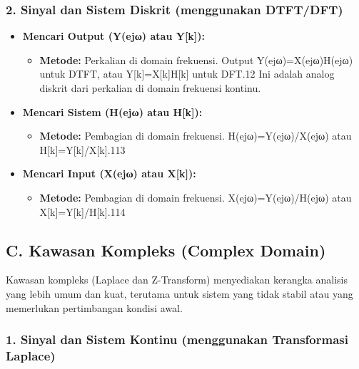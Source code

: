 \documentclass[
  letterpaper,
  DIV=11,
  numbers=noendperiod]{scrreprt}
\providecommand{\tightlist}{%
  \setlength{\itemsep}{0pt}\setlength{\parskip}{0pt}}\usepackage{longtable,booktabs,array}
\begin{document}
\subsubsection{2. Sinyal dan Sistem Diskrit (menggunakan
DTFT/DFT)}\label{sinyal-dan-sistem-diskrit-menggunakan-dtftdft}

\begin{itemize}
\item
  \textbf{Mencari Output (Y(ejω) atau Y{[}k{]}):}

  \begin{itemize}
  \tightlist
  \item
    \textbf{Metode:} Perkalian di domain frekuensi. Output
    Y(ejω)=X(ejω)H(ejω) untuk DTFT, atau Y{[}k{]}=X{[}k{]}H{[}k{]} untuk
    DFT.12 Ini adalah analog diskrit dari perkalian di domain frekuensi
    kontinu.
  \end{itemize}
\item
  \textbf{Mencari Sistem (H(ejω) atau H{[}k{]}):}

  \begin{itemize}
  \tightlist
  \item
    \textbf{Metode:} Pembagian di domain frekuensi. H(ejω)=Y(ejω)/X(ejω)
    atau H{[}k{]}=Y{[}k{]}/X{[}k{]}.113
  \end{itemize}
\item
  \textbf{Mencari Input (X(ejω) atau X{[}k{]}):}

  \begin{itemize}
  \tightlist
  \item
    \textbf{Metode:} Pembagian di domain frekuensi. X(ejω)=Y(ejω)/H(ejω)
    atau X{[}k{]}=Y{[}k{]}/H{[}k{]}.114
  \end{itemize}
\end{itemize}

\subsection{C. Kawasan Kompleks (Complex
Domain)}\label{c.-kawasan-kompleks-complex-domain-1}

Kawasan kompleks (Laplace dan Z-Transform) menyediakan kerangka analisis
yang lebih umum dan kuat, terutama untuk sistem yang tidak stabil atau
yang memerlukan pertimbangan kondisi awal.

\subsubsection{1. Sinyal dan Sistem Kontinu (menggunakan Transformasi
Laplace)}\label{sinyal-dan-sistem-kontinu-menggunakan-transformasi-laplace}
\end{document}
